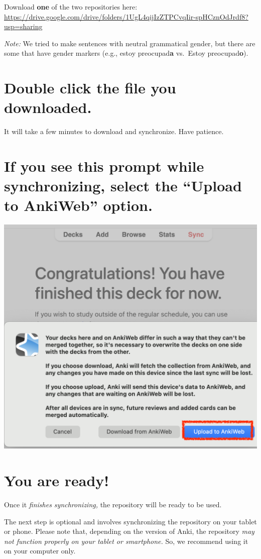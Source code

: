 \documentclass[
]{book}
\begin{document}
Download \textbf{one} of the two repositories here: \url{https://drive.google.com/drive/folders/1UgL4qijIzZTPCvqIir-spHCznOdJrdf8?usp=sharing}

\emph{Note:} We tried to make sentences with neutral grammatical gender, but there are some that have gender markers (e.g., estoy preocupad\textbf{a} vs.~Estoy preocupad\textbf{o}).

\section{Double click the file you downloaded.}\label{double-click-the-file-you-downloaded.}

It will take a few minutes to download and synchronize. Have patience.

\section*{If you see this prompt while synchronizing, select the ``Upload to AnkiWeb'' option.}\label{if-you-see-this-prompt-while-synchronizing-select-the-upload-to-ankiweb-option.}

\includegraphics[width=0.6\linewidth]{images/reposit_en/subir_a_anki}

\section{You are ready!}\label{you-are-ready}

Once it \emph{finishes synchronizing,} the repository will be ready to be used.

The next step is optional and involves synchronizing the repository on your tablet or phone. Please note that, depending on the version of Anki, the repository \emph{may not function properly on your tablet or smartphone.} So, we recommend using it on your computer only.
\end{document}
